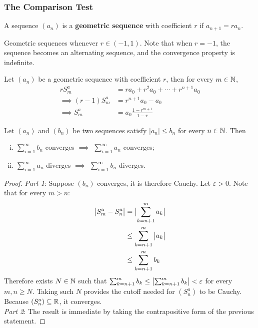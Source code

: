 \documentclass[11pt]{article}
\begin{document}
	\subsubsection{The Comparison Test}
	\begin{definition}
		A sequence $(a_n)$ is a \textbf{geometric sequence} with coefficient $r$ if $a_{n+1} = r a_n$.
	\end{definition}
	
	\begin{proposition}
		Geometric sequences whenever $r \in (-1, 1)$. Note that when $r = -1$, the sequence becomes an alternating sequence, and the convergence property is indefinite.
	\end{proposition}
	
	\begin{proposition}
		Let $(a_n)$ be a geometric sequence with coefficient $r$, then for every $m \in \mathbb{N}$,
		\begin{align}
			r S^a_m &= ra_0 + r^2 a_0 + \cdots + r^{n+1} a_0 \\
			\implies (r - 1) S^a_m &= r^{n+1} a_0 - a_0 \\
			\implies S^a_m &= a_0 \frac{1 - r^{m+1}}{1 - r}
		\end{align}
	\end{proposition}
	
	\begin{theorem}
		Let $(a_n)$ and $(b_n)$ be two sequences satisfy $|a_n| \leq b_n$ for every $n \in \mathbb{N}$. Then
		\begin{enumerate}[(i)]
			\item $\sum_{i=1}^\infty b_n$ converges $\implies$ $\sum_{i=1}^\infty a_n$ converges;
			\item $\sum_{i=1}^\infty a_n$ diverges $\implies$ $\sum_{i=1}^\infty b_n$ diverges.
		\end{enumerate}
	\end{theorem}
	
	\begin{proof}
		\emph{Part 1}: Suppose $(b_n)$ converges, it is therefore Cauchy. Let $\varepsilon > 0$.
		Note that for every $m > n$:
		\begin{align}
			\big \vert {S^a_m - S^a_n} \big \vert &= \big \vert {\sum_{k=n+1}^m a_k} \big \vert \\
			&\leq \sum_{k=n+1}^m \big \vert {a_k} \big \vert \\
			&\leq \sum_{k=n+1}^m b_k
		\end{align}
		Therefore exists $N \in \mathbb{N}$ such that $\sum_{k=n+1}^m b_k \leq \big \vert {\sum_{k=n+1}^m b_k} \big \vert < \varepsilon$ for every $m, n \geq N$. Taking such $N$ provides the cutoff needed for $(S_n^a)$ to be Cauchy. Because $(S_n^a) \subseteq \mathbb{R}$, it converges. \\
		\emph{Part 2}: The result is immediate by taking the contrapositive form of the previous statement.
	\end{proof}
	
\end{document}
